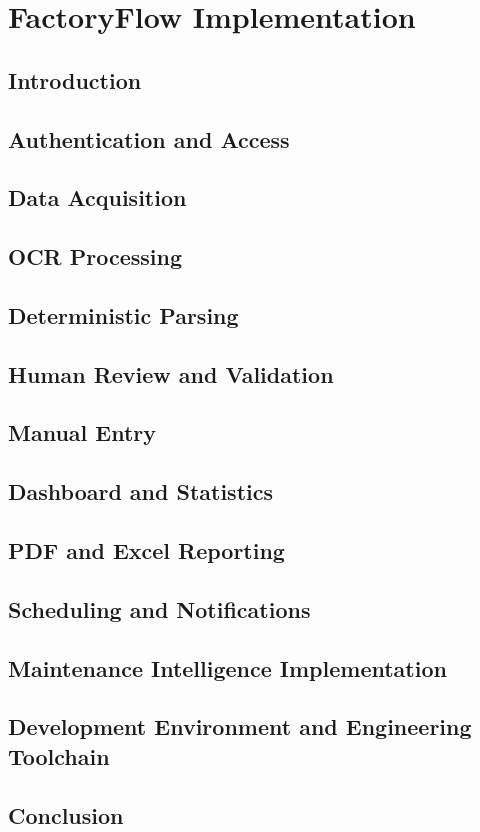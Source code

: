 \chapter{FactoryFlow Implementation}

\section{Introduction}

\section{Authentication and Access}

\section{Data Acquisition}

\section{OCR Processing}

\section{Deterministic Parsing}

\section{Human Review and Validation}

\section{Manual Entry}

\section{Dashboard and Statistics}

\section{PDF and Excel Reporting}

\section{Scheduling and Notifications}

\section{Maintenance Intelligence Implementation}

\section{Development Environment and Engineering Toolchain}

\section{Conclusion}

